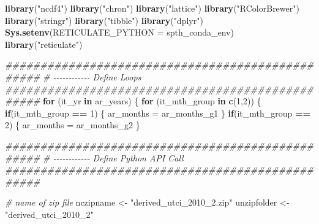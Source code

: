 \documentclass[
]{book}
\newenvironment{Shaded}{\begin{snugshade}}{\end{snugshade}}
\newcommand{\CommentTok}[1]{\textcolor[rgb]{0.56,0.35,0.01}{\textit{#1}}}
\newcommand{\ControlFlowTok}[1]{\textcolor[rgb]{0.13,0.29,0.53}{\textbf{#1}}}
\newcommand{\DataTypeTok}[1]{\textcolor[rgb]{0.13,0.29,0.53}{#1}}
\newcommand{\DecValTok}[1]{\textcolor[rgb]{0.00,0.00,0.81}{#1}}
\newcommand{\KeywordTok}[1]{\textcolor[rgb]{0.13,0.29,0.53}{\textbf{#1}}}
\newcommand{\NormalTok}[1]{#1}
\newcommand{\OperatorTok}[1]{\textcolor[rgb]{0.81,0.36,0.00}{\textbf{#1}}}
\newcommand{\StringTok}[1]{\textcolor[rgb]{0.31,0.60,0.02}{#1}}
\begin{document}
\begin{Shaded}
\begin{Highlighting}[]
\KeywordTok{library}\NormalTok{(}\StringTok{"ncdf4"}\NormalTok{)}
\KeywordTok{library}\NormalTok{(}\StringTok{"chron"}\NormalTok{)}
\KeywordTok{library}\NormalTok{(}\StringTok{"lattice"}\NormalTok{)}
\KeywordTok{library}\NormalTok{(}\StringTok{"RColorBrewer"}\NormalTok{)}
\KeywordTok{library}\NormalTok{(}\StringTok{"stringr"}\NormalTok{)}
\KeywordTok{library}\NormalTok{(}\StringTok{"tibble"}\NormalTok{)}
\KeywordTok{library}\NormalTok{(}\StringTok{"dplyr"}\NormalTok{)}
\KeywordTok{Sys.setenv}\NormalTok{(}\DataTypeTok{RETICULATE\_PYTHON =}\NormalTok{ spth\_conda\_env)}
\KeywordTok{library}\NormalTok{(}\StringTok{"reticulate"}\NormalTok{)}

\CommentTok{\#\#\#\#\#\#\#\#\#\#\#\#\#\#\#\#\#\#\#\#\#\#\#\#\#\#\#\#\#\#\#\#\#\#\#\#\#\#\#\#\#\#\#\#\#\#\#\#\#}
\CommentTok{\# {-}{-}{-}{-}{-}{-}{-}{-}{-}{-}{-}{-} Define Loops}
\CommentTok{\#\#\#\#\#\#\#\#\#\#\#\#\#\#\#\#\#\#\#\#\#\#\#\#\#\#\#\#\#\#\#\#\#\#\#\#\#\#\#\#\#\#\#\#\#\#\#\#\#}
\ControlFlowTok{for}\NormalTok{ (it\_yr }\ControlFlowTok{in}\NormalTok{ ar\_years) \{}
  \ControlFlowTok{for}\NormalTok{ (it\_mth\_group }\ControlFlowTok{in} \KeywordTok{c}\NormalTok{(}\DecValTok{1}\NormalTok{,}\DecValTok{2}\NormalTok{)) \{}
    \ControlFlowTok{if}\NormalTok{(it\_mth\_group }\OperatorTok{==}\StringTok{ }\DecValTok{1}\NormalTok{) \{}
\NormalTok{      ar\_months =}\StringTok{ }\NormalTok{ar\_months\_g1}
\NormalTok{    \}}
    \ControlFlowTok{if}\NormalTok{(it\_mth\_group }\OperatorTok{==}\StringTok{ }\DecValTok{2}\NormalTok{) \{}
\NormalTok{      ar\_months =}\StringTok{ }\NormalTok{ar\_months\_g2}
\NormalTok{    \}}

    \CommentTok{\#\#\#\#\#\#\#\#\#\#\#\#\#\#\#\#\#\#\#\#\#\#\#\#\#\#\#\#\#\#\#\#\#\#\#\#\#\#\#\#\#\#\#\#\#\#\#\#\#}
    \CommentTok{\# {-}{-}{-}{-}{-}{-}{-}{-}{-}{-}{-}{-} Define Python API Call}
    \CommentTok{\#\#\#\#\#\#\#\#\#\#\#\#\#\#\#\#\#\#\#\#\#\#\#\#\#\#\#\#\#\#\#\#\#\#\#\#\#\#\#\#\#\#\#\#\#\#\#\#\#}

    \CommentTok{\# name of zip file}
\NormalTok{    nczipname \textless{}{-}}\StringTok{ "derived\_utci\_2010\_2.zip"}
\NormalTok{    unzipfolder \textless{}{-}}\StringTok{ "derived\_utci\_2010\_2"}


\end{Highlighting}
\end{Shaded}
\end{document}
